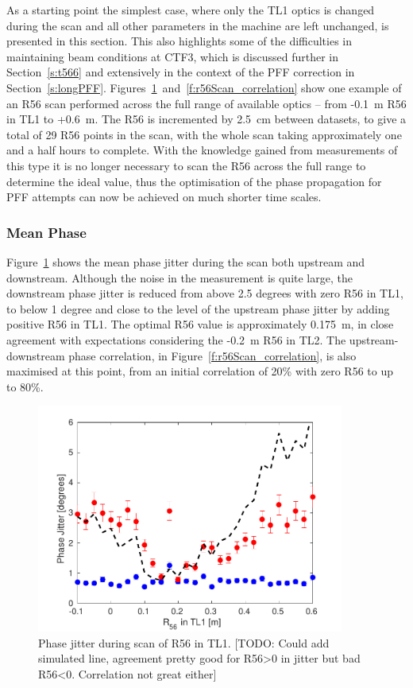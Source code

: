 As a starting point the simplest case, where only the TL1 optics is changed during the scan and all other parameters in the machine are left unchanged, is presented in this section. This also highlights some of the difficulties in maintaining beam conditions at CTF3, which is discussed further in Section~\ref{s:t566} and extensively in the context of the PFF correction in Section~\ref{s:longPFF}. Figures~\ref{f:r56Scan_meanPhaseJit}~and~\ref{f:r56Scan_correlation} show one example of an R56 scan performed across the full range of available optics -- from -0.1~m R56 in TL1 to +0.6~m. The R56 is incremented by 2.5~cm between datasets, to give a total of 29 R56 points in the scan, with the whole scan taking approximately one and a half hours to complete. With the knowledge gained from measurements of this type it is no longer necessary to scan the R56 across the full range to determine the ideal value, thus the optimisation of the phase propagation for PFF attempts can now be achieved on much shorter time scales.

\subsubsection{Mean Phase}

Figure~\ref{f:r56Scan_meanPhaseJit} shows the mean phase jitter during the scan both upstream and downstream. Although the noise in the measurement is quite large, the downstream phase jitter is reduced from above 2.5 degrees with zero R56 in TL1, to below 1 degree and close to the level of the upstream phase jitter by adding positive R56 in TL1. The optimal R56 value is approximately 0.175~m, in close agreement with expectations considering the -0.2~m R56 in TL2. The upstream-downstream phase correlation, in Figure~\ref{f:r56Scan_correlation}, is also maximised at this point, from an initial correlation of 20\% with zero R56 to up to 80\%.

\begin{figure}
  \centering
  \includegraphics[width=0.9\textwidth]{Figures/propagation/r56Scan_meanPhaseJit}
  \caption{Phase jitter during scan of R56 in TL1. [TODO: Could add simulated line, agreement pretty good for R56>0 in jitter but bad R56<0. Correlation not great either]}
  \label{f:r56Scan_meanPhaseJit}
\end{figure}

